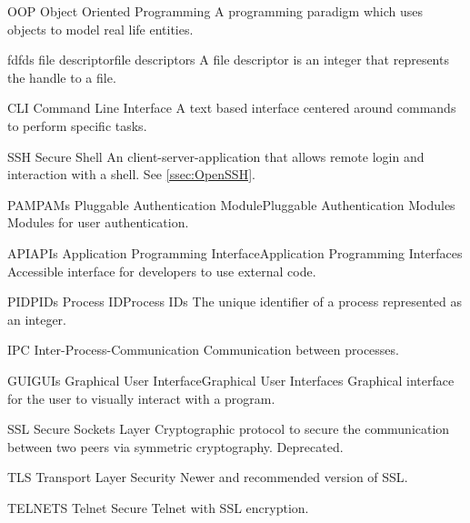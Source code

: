 %
{OOP}{}%
{Object Oriented Programming}{}%
{A programming paradigm which uses objects to model real life entities.}

%
{fd}{fds}%
{file descriptor}{file descriptors}%
{A file descriptor is an integer that represents the handle to a file.}

%
{CLI}{}%
{Command Line Interface}{}%
{A text based interface centered around commands to perform specific tasks.}

%
{SSH}{}%
{Secure Shell}{}%
{An client-server-application that allows remote login and interaction with a \gls{shell}. See \ref{ssec:OpenSSH}.}

%
{PAM}{PAMs}%
{Pluggable Authentication Module}{Pluggable Authentication Modules}%
{Modules for user authentication.}

%
{API}{APIs}%
{Application Programming Interface}{Application Programming Interfaces}%
{Accessible interface for developers to use external code.}

%
{PID}{PIDs}%
{Process ID}{Process IDs}%
{The unique identifier of a process represented as an integer.}

%
{IPC}{}%
{Inter-Process-Communication}{}%
{Communication between processes.}

%
{GUI}{GUIs}%
{Graphical User Interface}{Graphical User Interfaces}%
{Graphical interface for the user to visually interact with a program.}

%
{SSL}{}%
{Secure Sockets Layer}{}%
{Cryptographic protocol to secure the communication between two peers via symmetric cryptography. Deprecated.}

%
{TLS}{}%
{Transport Layer Security}{}%
{Newer and recommended version of \gls{SSL}.}

%
{TELNETS}{}%
{Telnet Secure}{}%
{Telnet with \gls{SSL} encryption.}


